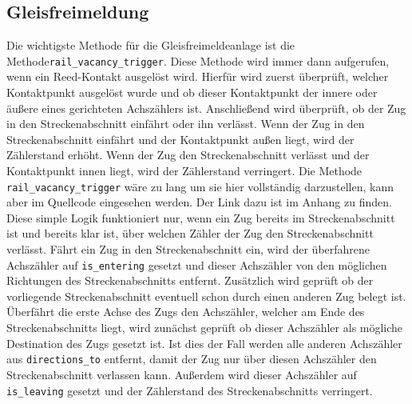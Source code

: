\subsection{Gleisfreimeldung}\label{text:Entwicklung-der-GFA:Implementierung-der-Gleisfreimeldeanlage:Implementierung-der-Gleisfreimeldeanlage}
Die wichtigste Methode für die Gleisfreimeldeanlage ist die Methode\newline \texttt{rail\_vacancy\_trigger}. Diese Methode wird immer dann aufgerufen, wenn ein Reed-Kontakt ausgelöst wird. Hierfür wird zuerst überprüft, welcher Kontaktpunkt ausgelöst wurde und ob dieser Kontaktpunkt der innere oder äußere eines gerichteten Achszählers ist. Anschließend wird überprüft, ob der Zug in den Streckenabschnitt einfährt oder ihn verlässt. Wenn der Zug in den Streckenabschnitt einfährt und der Kontaktpunkt außen liegt, wird der Zählerstand erhöht. Wenn der Zug den Streckenabschnitt verlässt und der Kontaktpunkt innen liegt, wird der Zählerstand verringert. Die Methode \texttt{rail\_vacancy\_trigger} wäre zu lang um sie hier vollständig darzustellen, kann aber im Quellcode eingesehen werden. Der Link dazu ist im Anhang zu finden.
\newline
Diese simple Logik funktioniert nur, wenn ein Zug bereits im Streckenabschnitt ist und bereits klar ist, über welchen Zähler der Zug den Streckenabschnitt verlässt.
\newline
Fährt ein Zug in den Streckenabschnitt ein, wird der überfahrene Achszähler auf \texttt{is\_entering} gesetzt und dieser Achszähler von den möglichen Richtungen des Streckenabschnitts entfernt. Zusätzlich wird geprüft ob der vorliegende Streckenabschnitt eventuell schon durch einen anderen Zug belegt ist.
\newline
Überfährt die erste Achse des Zugs den Achszähler, welcher am Ende des Streckenabschnitts liegt, wird zunächst geprüft ob dieser Achszähler als mögliche Destination des Zugs gesetzt ist. Ist dies der Fall werden alle anderen Achszähler aus \texttt{directions\_to} entfernt, damit der Zug nur über diesen Achszähler den Streckenabschnitt verlassen kann. Außerdem wird dieser Achszähler auf \texttt{is\_leaving} gesetzt und der Zählerstand des Streckenabschnitts verringert.
